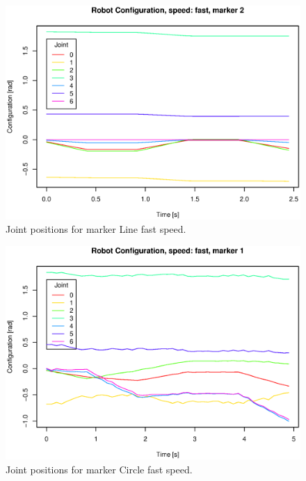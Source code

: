 \begin{figure}[H]\centering\includegraphics[width=\fullImageWidth]{graphics/rovi_robot_configuration_fast_marker2.eps}  \caption{Joint positions for marker Line   fast speed.  }     \label{fig:rovi_joint_pos_F_Line  }   \end{figure}
\begin{figure}[H]\centering\includegraphics[width=\fullImageWidth]{graphics/rovi_robot_configuration_fast_marker1.eps}  \caption{Joint positions for marker Circle fast speed.  }     \label{fig:rovi_joint_pos_F_Circle}   \end{figure}
